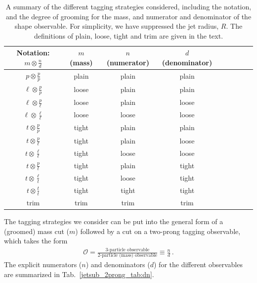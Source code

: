 \documentclass[11pt,letterpaper]{article}
\begin{document}
\begin{table}[t!]
\begin{center}
\begin{tabular}{| c | c | c |c |c|c|c |c|c | }
  \hline                       
  Notation: $m \otimes \frac{n}{d}$ & $m$ (mass) & $n$ (numerator) & $d$ (denominator)\\
  \hline
  $p \otimes \frac{p}{p}$ & plain  &  plain & plain \\
  $\ell \otimes \frac{p}{p}$ & loose  &  plain & plain \\
  $\ell \otimes \frac{p}{\ell}$ & loose  &  plain & loose \\
  $\ell \otimes \frac{\ell}{\ell}$ & loose  &  loose & loose \\
  $t \otimes \frac{p}{p}$ & tight  &  plain & plain \\
  $t \otimes \frac{p}{\ell}$ & tight  &  plain & loose \\
  $t \otimes \frac{\ell}{\ell}$ & tight  &  loose & loose \\
  $t \otimes \frac{p}{t}$ & tight  &  plain & tight \\
  $t \otimes \frac{\ell}{t}$ & tight  &  loose & tight \\
  $t \otimes \frac{t}{t}$ & tight  &  tight & tight \\
  \hline
  $\text{trim}$ & trim &  trim & trim \\
  \hline  
\end{tabular}
\end{center}
\caption{ A summary of the different tagging strategies considered,
  including the notation, and the degree of grooming for the mass, and
  numerator and denominator of the shape observable. For simplicity,
  we have suppressed the jet radius, $R$. The definitions of plain,
  loose, tight and trim are given in the text.}
\label{jetsub_2prong_tab:tag_summary}
\end{table}

The tagging strategies we consider can be put into the general form of a (groomed) mass cut ($m$) followed by a cut on a two-prong tagging observable, which takes the form
%
\begin{align}
\mathcal{O}=\frac{\text{3-particle observable}}{\text{2-particle (mass) observable}} \equiv \frac{n}{d}\,.
\end{align}
%
The explicit numerators ($n$) and denominators ($d$) for the different observables are summarized in Tab.~\ref{jetsub_2prong_tab:dn}.
\end{document}
